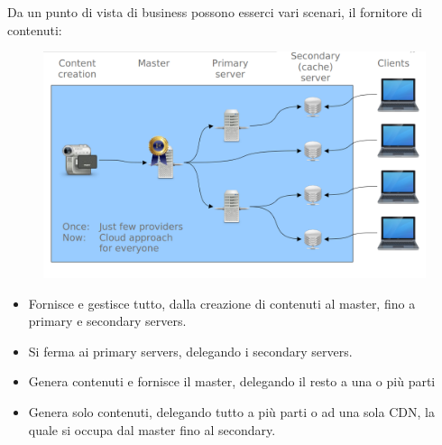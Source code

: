 \documentclass{article}
\begin{document}
		Da un punto di vista di business possono esserci vari scenari, il fornitore di contenuti:
		\begin{figure}[ht]
			\centering
			\includegraphics[width=0.7\linewidth]{SAC_A5_contentprovider}
			\label{fig:saca5contentprovider}
		\end{figure}
		
		\begin{itemize}
		    \item Fornisce e gestisce tutto, dalla creazione di contenuti al master, fino a primary e secondary servers.
		    \item Si ferma ai primary servers, delegando i secondary servers.
		    \item Genera contenuti e fornisce il master, delegando il resto a una o più parti
		    \item Genera solo contenuti, delegando tutto a più parti o ad una sola CDN, la quale si occupa dal master fino al secondary.
		\end{itemize}
		
\end{document}
